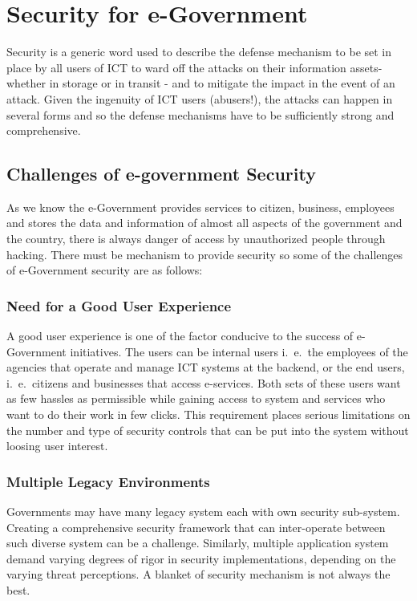 \chapter{Security for e-Government}
Security is a generic word used to describe the defense mechanism to be set in place by all users of ICT to ward off the attacks on their information assets-whether in storage or in transit - and to mitigate the impact in the event of an attack. Given the ingenuity of ICT users (abusers!), the attacks can happen in several forms and so the defense mechanisms have to be sufficiently strong and comprehensive.

 \section{Challenges of e-government Security}
 As we know the e-Government provides services to citizen, business, employees and stores the data and information of almost all aspects of the government and the country, there is always danger of access by unauthorized people through hacking. There must be mechanism to provide security  so some of the challenges of e-Government security are as follows\cite{jayramChaulagain}:
 
 \subsection{Need for a Good User Experience}
  A good user experience is one of the factor conducive to the success of e-Government initiatives. The users can be internal users i.\ e.\ the employees of the agencies that operate and manage ICT systems at the backend, or the end users, i.\ e.\ citizens and businesses that access e-services. Both sets of these users want as few hassles as permissible while gaining access to system and services who want to do their work in few clicks. This requirement places serious limitations on the number and type of security controls that can be put into the system without loosing user interest.
  
  \subsection{Multiple Legacy Environments}
  Governments may have many legacy system each with own security sub-system. Creating a comprehensive security framework that can inter-operate between such diverse system can be a challenge. Similarly, multiple application system demand varying degrees of rigor in security implementations, depending on the varying threat perceptions. A blanket of security mechanism is not always the best.
  
